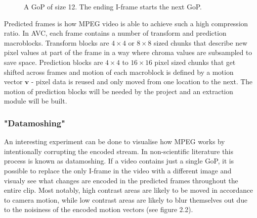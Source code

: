 \documentclass[11pt,english]{report}
\newcommand*{\angleframe}[7]{%
\begin{scope}[xshift  =#4, yshift = #5,
			every node/.append style = {yslant = #7},
			yslant = #7,
			local bounding box = #2]
\node[#1] at (#6,#6) {};
\node[label, yslant = -#7, above right=9em and -0.75em of #2.south east](#2-label) {#3};
\end{scope}
}
\begin{document}
\begin{figure}[!ht]
	\centering
	\caption{\centering A GoP of size 12. The ending I-frame starts the next GoP.}
\end{figure}

Predicted frames is how MPEG video is able to achieve such a high compression ratio. In AVC, each frame contains a number of transform and prediction macroblocks. Transform blocks are $4 \times 4$ or $8 \times 8$ sized chunks that describe new pixel values at part of the frame in a way where chroma values are subsampled to save space. Prediction blocks are $4 \times 4$ to $16 \times 16$ pixel sized chunks that get shifted across frames and motion of each macroblock is defined by a motion vector $\mathbf{v}$ - pixel data is reused and only moved from one location to the next. The motion of prediction blocks will be needed by the project and an extraction module will be built.

\subsubsection{"Datamoshing"}

An interesting experiment can be done to visualise how MPEG works by intentionally corrupting the encoded stream. In non-scientific literature this process is known as datamoshing. If a video contains just a single GoP, it is possible to replace the only I-frame in the video with a different image and visualy see what changes are encoded in the predicted frames throughout the entire clip. Most notably, high contrast areas are likely to be moved in accordance to camera motion, while low contrast areas are likely to blur themselves out due to the noisiness of the encoded motion vectors (see figure 2.2).
\end{document}
